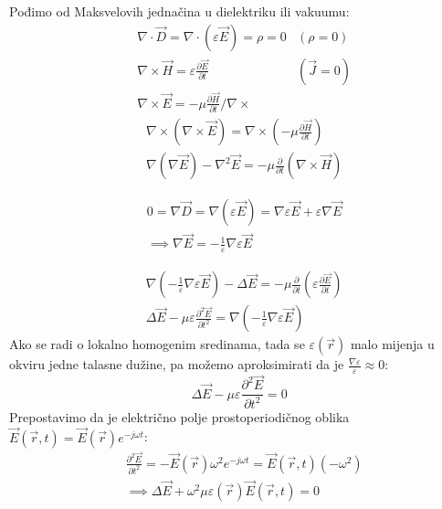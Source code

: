 \documentclass[fleqn]{report}
\begin{document}
Pođimo od Maksvelovih jednačina u dielektriku ili vakuumu:
\begin{align}
     & \nabla \cdot \vec D = \nabla \cdot (\varepsilon \vec E) = \rho = 0                                        & (\rho = 0) \nonumber                \\
     & \nabla \times \vec H = \varepsilon \frac{\partial \vec E}{\partial t}                                     & (\vec J = 0) \label{gs - faradejev} \\
     & \nabla \times \vec E = - \mu \frac{\partial \vec H}{\partial t} \bigg/ \nabla \times \label{gs - amperov}
\end{align}
\begin{align*}
     & \nabla \times (\nabla \times \vec E) = \nabla \times \left(-\mu \frac{\partial \vec H}{\partial t}\right) \\
     & \nabla (\nabla \vec E) - \nabla^2 \vec E = - \mu \frac{\partial}{\partial t} (\nabla\times\vec H)
\end{align*}
\begin{tbox}
    \begin{align*}
         & 0 = \nabla\vec D = \nabla(\varepsilon\vec E) = \nabla\varepsilon \vec E + \varepsilon\nabla\vec E \\
         & \implies \nabla\vec E = -\frac{1}{\varepsilon} \nabla\varepsilon \vec E
    \end{align*}
\end{tbox}
\begin{align*}
     & \nabla\left(-\frac{1}{\varepsilon}\nabla\varepsilon\vec E \right) - \Delta \vec E = -\mu\frac{\partial}{\partial t}\left(\varepsilon\frac{\partial\vec E}{\partial t}\right) \\
     & \Delta\vec E - \mu\varepsilon\frac{\partial^2\vec E}{\partial t^2} = \nabla\left(-\frac{1}{\varepsilon}\nabla\varepsilon\vec E\right)
\end{align*}
Ako se radi o lokalno homogenim sredinama, tada se $\varepsilon(\vec r)$ malo mijenja u okviru jedne talasne dužine, pa možemo aproksimirati da je $\frac{\nabla\varepsilon}{\varepsilon} \approx 0$:
\begin{equation*}
    \Delta\vec E - \mu\varepsilon\frac{\partial^2\vec E}{\partial t^2} = 0
\end{equation*}
Prepostavimo da je električno polje prostoperiodičnog oblika $\vec E(\vec r, t) = \vec E(\vec r)e^{-j\omega t}$:
\begin{align*}
     & \frac{\partial^2 \vec E}{\partial t^2} = - \vec E(\vec r) \omega^2 e^{-j\omega t} = \vec E(\vec r, t) (-\omega^2) \\
     & \implies \Delta\vec E + \omega^2\mu\varepsilon(\vec r)\vec E(\vec r, t) = 0
\end{align*}
\end{document}
